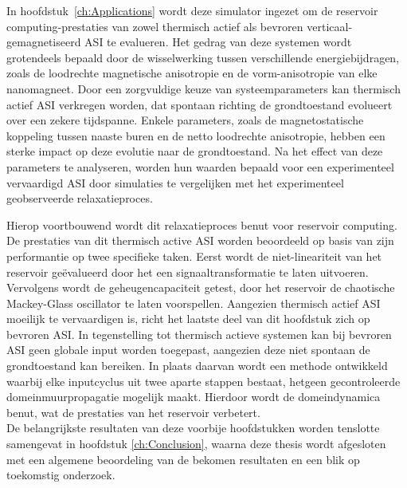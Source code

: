In hoofdstuk~\ref{ch:Applications} wordt deze \hotspice simulator ingezet om de reservoir computing-prestaties van zowel thermisch actief als bevroren verticaal-gemagnetiseerd ASI te evalueren.
Het gedrag van deze systemen wordt grotendeels bepaald door de wisselwerking tussen verschillende energiebijdragen, zoals de loodrechte magnetische anisotropie en de vorm-anisotropie van elke nanomagneet.
Door een zorgvuldige keuze van systeemparameters kan thermisch actief ASI verkregen worden, dat spontaan richting de grondtoestand evolueert over een zekere tijdspanne.
Enkele parameters, zoals de magnetostatische koppeling tussen naaste buren en de netto loodrechte anisotropie, hebben een sterke impact op deze evolutie naar de grondtoestand.
Na het effect van deze parameters te analyseren, worden hun waarden bepaald voor een experimenteel vervaardigd ASI door simulaties te vergelijken met het experimenteel geobserveerde relaxatieproces. \par
Hierop voortbouwend wordt dit relaxatieproces benut voor reservoir computing.
De prestaties van dit thermisch active ASI worden beoordeeld op basis van zijn performantie op twee specifieke taken.
Eerst wordt de niet-lineariteit van het reservoir ge\"evalueerd door het een signaaltransformatie te laten uitvoeren.
Vervolgens wordt de geheugencapaciteit getest, door het reservoir de chaotische Mackey-Glass oscillator te laten voorspellen.
Aangezien thermisch actief ASI moeilijk te vervaardigen is, richt het laatste deel van dit hoofdstuk zich op bevroren ASI.
In tegenstelling tot thermisch actieve systemen kan bij bevroren ASI geen globale input worden toegepast, aangezien deze niet spontaan de grondtoestand kan bereiken.
In plaats daarvan wordt een methode ontwikkeld waarbij elke inputcyclus uit twee aparte stappen bestaat, hetgeen gecontroleerde domeinmuurpropagatie mogelijk maakt.
Hierdoor wordt de domeindynamica benut, wat de prestaties van het reservoir verbetert. \\

De belangrijkste resultaten van deze voorbije hoofdstukken worden tenslotte samengevat in hoofdstuk \ref{ch:Conclusion}, waarna deze thesis wordt afgesloten met een algemene beoordeling van de bekomen resultaten en een blik op toekomstig onderzoek. %
